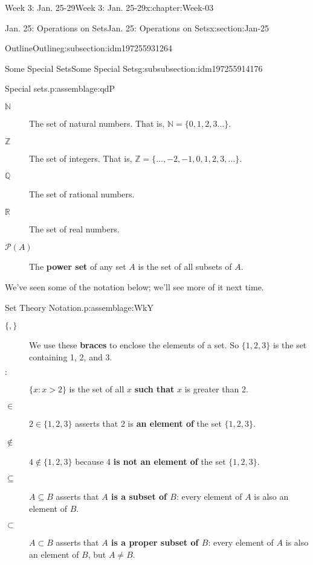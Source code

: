 \documentclass[oneside,10pt,]{book}
\newcommand{\terminology}[1]{\textbf{#1}}
\numberwithin{equation}{section}
\def\Z{{\mathbb Z}}
\def\Q{{\mathbb Q}}
\def\N{{\mathbb N}}
\def\pow{{\mathcal P}}
\def\R{{\mathbb R}}
\newcommand{\N}{\mathbb N}
\newcommand{\Z}{\mathbb Z}
\newcommand{\Q}{\mathbb Q}
\newcommand{\R}{\mathbb R}
\newcommand{\pow}{\mathcal P}
\newcommand{\st}{:}
\begin{document}
\begin{chapterptx}{Week 3: Jan. 25-29}{}{Week 3: Jan. 25-29}{}{}{x:chapter:Week-03}
\begin{sectionptx}{Jan. 25: Operations on Sets}{}{Jan. 25: Operations on Sets}{}{}{x:section:Jan-25}
\begin{subsectionptx}{Outline}{}{Outline}{}{}{g:subsection:idm197255931264}
\begin{subsubsectionptx}{Some Special Sets}{}{Some Special Sets}{}{}{g:subsubsection:idm197255914176}
\begin{assemblage}{Special sets.}{p:assemblage:qdP}
\begin{description}
\item[{\(\N\)}]The set of natural numbers. That is, \(\N = \{0, 1, 2, 3\ldots\}\). \label{g:notation:idm197255901616}%
\item[{\(\Z\)}]The set of integers. That is, \(\Z = \{\ldots, -2, -1, 0, 1, 2, 3, \ldots\}\). \label{g:notation:idm197255895488}%
\item[{\(\Q\)}]The set of rational numbers. \label{g:notation:idm197255892960}%
\item[{\(\R\)}]The set of real numbers. \label{g:notation:idm197255888848}%
\item[{\(\pow(A)\)}]The \terminology{power set} of any set \(A\) is the set of all subsets of \(A\). \label{g:notation:idm197255882784}%
\end{description}
%
\end{assemblage}
We've seen some of the notation below; we'll see more of it next time.%
\begin{assemblage}{Set Theory Notation.}{p:assemblage:WkY}%
%
\begin{description}
\item[{\(\{, \}\)}]We use these \terminology{braces} to enclose the elements of a set. So \(\{1,2,3\}\) is the set containing 1, 2, and 3. \label{g:notation:idm197255875072}%
\item[{\(\st\)}]\(\{x \st x > 2\}\) is the set of all \(x\) \terminology{such that} \(x\) is greater than 2. \label{g:notation:idm197255870464}%
\item[{\(\in\)}]\(2 \in \{1,2,3\}\) asserts that 2 is \terminology{an element of} the set \(\{1,2,3\}\). \label{g:notation:idm197255866480}%
\item[{\(\not\in\)}]\(4 \notin \{1,2,3\}\) because 4 \terminology{is not an element of} the set \(\{1,2,3\}\).%
\item[{\(\subseteq\)}]\(A \subseteq B\) asserts that \terminology{\(A\) is a subset of \(B\)}: every element of \(A\) is also an element of \(B\). \label{g:notation:idm197255858128}%
\item[{\(\subset\)}]\(A \subset B\) asserts that \terminology{\(A\) is a proper subset of \(B\)}: every element of \(A\) is also an element of \(B\), but \(A \ne B\). \label{g:notation:idm197255852592}%

\end{description}
\end{assemblage}
\end{subsubsectionptx}
\end{subsectionptx}
\end{sectionptx}
\end{chapterptx}
\end{document}
